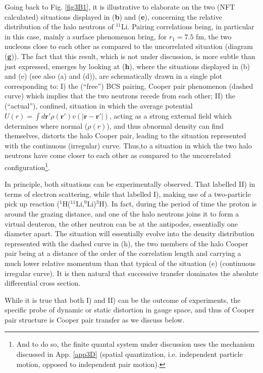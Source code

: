 Going back to Fig. \ref{fig3B1}, it is illustrative to elaborate on the two (NFT calculated) situations displayed in (\textbf{b}) and (\textbf{e}), concerning the relative distribution of the halo neutrons of $^{11}$Li. Pairing correlations being, in particular in this case, mainly a surface phenomenon bring, for $r_1=7.5$ fm, the two nucleons close to each other as compared to the uncorrelated situation (diagram (\textbf{g})). The fact that this result, which is not under discussion, is more subtle than just expressed, emerges by looking at (\textbf{h}), where the situations displayed in (b) and (e) (see also (a) and (d)), are schematically drawn in a single plot corresponding to: I) the (``free'') BCS  pairing, Cooper pair phenomenon (dashed curve) which implies that the two neutrons recede from each other; II) the (``actual''), confined, situation in which the average potential $U(r)=\int  d\mathbf r' \rho(\mathbf r')v(|\mathbf r-\mathbf r'|)$, acting as a strong external field which determines where normal ($\rho(r)$), and thus abnormal density can find themselves, distorts the halo Cooper pair, leading to the situation represented with the continuous (irregular) curve. Thus,to a situation in which the two halo neutrons have come closer to each other as compared to the uncorrelated configuration\footnote{And to do so, the finite quantal system under discussion uses the mechanism discussed in App. \ref{app3D} (spatial quantization, i.e. independent particle motion, opposed to independent pair motion).}. 


In principle, both situations can be experimentally observed. That labelled II) in terms of electron scattering, while that labelled I),  making use of a two-particle pick up reaction ($^1$H($^{11}$Li,$^9$Li)$^3$H). In fact, during the period of time the proton is around the grazing distance, and one of the halo neutrons joins it to form a virtual deuteron, the other neutron can be at the antipodes, essentially one diameter apart. The situation will essentially evolve into the density distribution represented with the dashed curve in (h), the two members of the halo Cooper pair being at a distance of the order of the correlation length and carrying a much lower relative momentum than that typical of the situation (e) (continuous irregular curve). It is then natural that successive transfer dominates the absolute differential cross section.

While it is true that both I) and II) can be the outcome of experiments, the specific probe of dynamic or static distortion in gauge space, and thus of Cooper pair structure is Cooper pair transfer as we discuss below.


